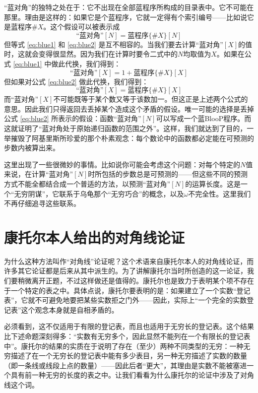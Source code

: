 “蓝对角”的独特之处在于：它不出现在全部蓝程序所构成的目录表中。它不可能在那里。理由是这样的：如果它是个蓝程序，它就一定得有个索引编号——比如说它是蓝程序$\#X$。这个假设可以被表示成
\begin{equation}\label{eq:blue2}
\text{“蓝对角”}[N]=\text{蓝程序}\{\#X\}[N]
\end{equation}
但等式 \eqref{eq:blue1} 和 \eqref{eq:blue2} 是互不相容的。当我们要去计算“蓝对角”$[X]$的值时，这就会变得很显然。因为我们在计算时要令二式中的$N$均取值为$X$。如果在公式 \eqref{eq:blue1} 中做此代换，我们得到：
\[
\text{“蓝对角”}[X]=1+\text{蓝程序}\{\#X\}[X]
\]
但如果对公式 \eqref{eq:blue2} 做此代换，我们得到：
\[
\text{“蓝对角”}[X]=\text{蓝程序}\{\#X\}[X]
\]
而“蓝对角”$[X]$不可能既等于某个数又等于该数加一。但这正是上述两个公式的意思。因此我们只得返回去丢掉某个造成这个矛盾的假设。唯一可能的选择是丢掉公式 \eqref{eq:blue2} 所表示的假设：函数“蓝对角”$[N]$可以写成一个蓝BlooP程序。而这就证明了“蓝对角处于原始递归函数的范围之外”。这样，我们就达到了目的，一举摧毁了阿基里斯所珍爱的那个朴素观念：每个数论中的函数都必定能在可预测的步数内被算出来。

这里出现了一些很微妙的事情。比如说你可能会考虑这个问题：对每个特定的$N$值来说，在计算“蓝对角”$[N]$时所包括的步数总是可预测的——但这些不同的预测方式不能全都结合成一个普适的方法，以预测“蓝对角”$[N]$的运算长度。这是一个“无穷阴谋”，它联系于乌龟那个“无穷巧合”的概念，以及$\omega$不完全性。这里我们不再仔细追寻这些联系。

\section{康托尔本人给出的对角线论证}

为什么这种方法叫作“对角线”论证呢？这个术语来自康托尔本人的对角线论证，而许多其它论证都是后来从其中派生的。为了讲解康托尔当时所创造的这一论证，我们要稍微离开正题，不过这样做还是值得的。康托尔也是致力于表明某个项不存在于一个特定的表之中。具体点说，康托尔要表明的是：如果建立了一个实数“登记表”，它就不可避免地要把某些实数拒之门外——因此，实际上“一个完全的实数登记表”这个观念本身就是自相矛盾的。

必须看到，这不仅适用于有限的登记表，而且也适用于无穷长的登记表。这个结果比下述命题深刻得多：“实数有无穷多个，因此显然不能列在一个有限长的登记表中”。康托尔的结果的实质在于说明了存在（至少）两种不同类型的无穷：一种无穷描述了在一个无穷长的登记表中能有多少表目，另一种无穷描述了实数的数量（即一条线或线段上点的数量）——因此后者“更大”，其理由是实数不能被塞进一个具有前一种无穷的长度的表之中。让我们看看为什么康托尔的论证中涉及了对角线这个词。

